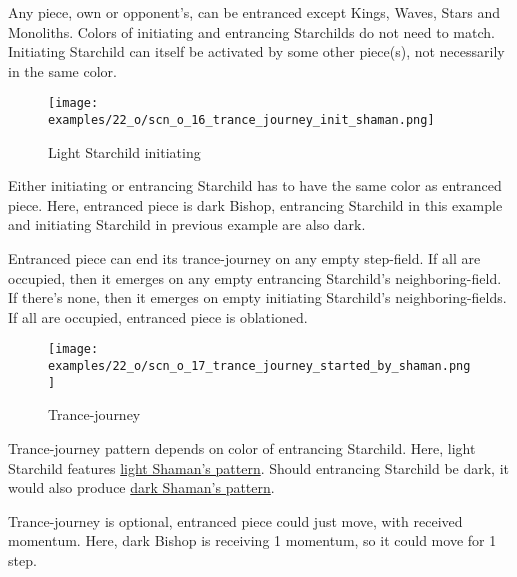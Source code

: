 Any piece, own or opponent's, can be entranced except Kings, Waves, Stars and Monoliths.
Colors of initiating and entrancing Starchilds do not need to match. Initiating Starchild can itself
be activated by some other piece(s), not necessarily in the same color.

\vspace*{-0.1\baselineskip}
\noindent
\begin{wrapfigure}[11]{l}{0.4\textwidth}
\centering
\texttt{[image: examples/22\_o/scn\_o\_16\_trance\_journey\_init\_shaman.png]}
\caption{Light Starchild initiating}
\label{fig:scn_o_16_trance_journey_init_shaman}
\end{wrapfigure}
Either initiating or entrancing Starchild has to have the same color as entranced piece.
Here, entranced piece is dark Bishop, entrancing Starchild in this example and initiating Starchild in
previous example are also dark.

Entranced piece can end its trance-journey on any empty step-field. If all are occupied, then it emerges
on any empty entrancing Starchild's neighboring-field. If there's none, then it emerges on empty initiating
Starchild's neighboring-fields. If all are occupied, entranced piece is oblationed.

\clearpage %

\vspace*{-2.1\baselineskip}
\noindent
\begin{figure}[!h]
\texttt{[image: examples/22\_o/scn\_o\_17\_trance\_journey\_started\_by\_shaman.png]}
\caption{Trance-journey}
\label{fig:scn_o_17_trance_journey_started_by_shaman}
\end{figure}

Trance-journey pattern depends on color of entrancing Starchild. Here, light Starchild features
\hyperref[fig:scn_cot_14_light_shaman_trance_journey]{light Shaman's pattern}. Should entrancing
Starchild be dark, it would also produce
\hyperref[fig:scn_cot_16_dark_shaman_trance_journey]{dark Shaman's pattern}.

Trance-journey is optional, entranced piece could just move, with received momentum.
Here, dark Bishop is receiving 1 momentum, so it could move for 1 step.

\clearpage %

